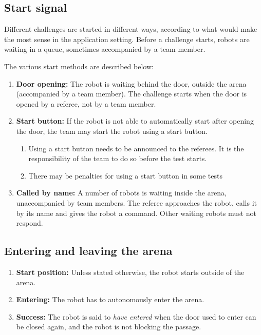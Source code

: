\subsection{Start signal}
\label{rule:start_signal}

Different challenges are started in different ways, according to what would make the most sense in the application setting. 
Before a challenge starts, robots are waiting in a queue, sometimes accompanied by a team member. 

The various start methods are described below:
\begin{enumerate}
	\item \textbf{Door opening:} The robot is waiting behind the door, outside the arena (accompanied by a team member). The challenge starts when the door is opened by a referee, not by a team member. 
	\item \textbf{Start button:} If the robot is not able to automatically start after opening the door, the team may start the robot using a start button. 
	\begin{enumerate}
		\item Using a start button needs to be announced to the referees. It is the responsibility of the team to do so before the test starts.
		\item There may be penalties for using a start button in some tests
	\end{enumerate}
    \item \textbf{Called by name:} A number of robots is waiting inside the arena, unaccompanied by team members. 
				      The referee approaches the robot, calls it by its name and gives the robot a command. 
				      Other waiting robots must not respond. 
\end{enumerate}


\subsection{Entering and leaving the arena}
\label{rule:start_position}
\begin{enumerate}
	\item \textbf{Start position:} Unless stated otherwise, the robot starts outside of the arena.
	\item \textbf{Entering:} The robot has to autonomously enter the arena.
	\item \textbf{Success:} The robot is said to \emph{have entered} when the door used to enter can be closed again, and the robot is not blocking the passage.
\end{enumerate}



